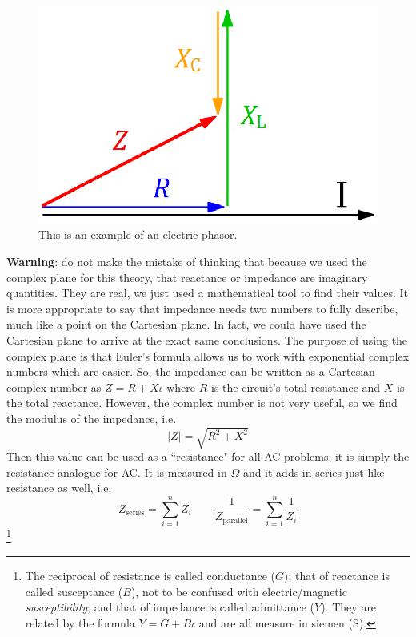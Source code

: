 \documentclass{scrartcl}
\newcommand\blfootnote[1]{
    \begingroup
    \renewcommand\thefootnote{}\footnote{#1}%
    \addtocounter{footnote}{-1}%
    \endgroup
}
\begin{document}
    \begin{figure}[H]
        \centering
        \includegraphics[scale=.66]{phasor.eps}
        \caption{This is an example of an electric phasor.}
    \end{figure}
    \textbf{Warning}: do not make the mistake of thinking that because we used the complex plane for this theory, that reactance or impedance are imaginary quantities. They are real, we just used a mathematical tool to find their values. It is more appropriate to say that impedance needs two numbers to fully describe, much like a point on the Cartesian plane. In fact, we could have used the Cartesian plane to arrive at the exact same conclusions. The purpose of using the complex plane is that Euler's formula allows us to work with exponential complex numbers which are easier.
    \quad So, the impedance can be written as a Cartesian complex number as $\boxed{Z=R+X\iota}$ where $R$ is the circuit's total resistance and $X$ is the total reactance. However, the complex number is not very useful, so we find the modulus of the impedance, i.e. \[|Z|=\sqrt{R^2+X^2}\] Then this value can be used as a ``resistance" for all AC problems; it is simply the resistance analogue for AC. It is measured in $\Omega$ and it adds in series just like resistance as well, i.e. \[\boxed{Z_\text{series}=\sum_{i=1}^nZ_i}\text{ }\text{ }\text{ }\boxed{\frac1{Z_\text{parallel}}=\sum_{i=1}^n\frac1{Z_i}}\] \blfootnote{The reciprocal of resistance is called conductance ($G)$; that of reactance is called susceptance ($B$), not to be confused with electric/magnetic \textit{susceptibility}; and that of impedance is called admittance ($Y$). They are related by the formula $\boxed{Y=G+B\iota}$ and are all measure in siemen (S).}
\end{document}
